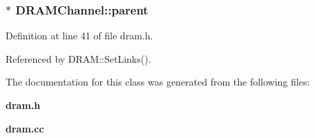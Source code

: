 \subsubsection[{parent}]{$\ast$ {\bf DRAMChannel::parent}}\label{classDRAMChannel_ed6753935c84ed93dd15aea96a530aca}




Definition at line 41 of file dram.h.

Referenced by DRAM::SetLinks().

The documentation for this class was generated from the following files:\begin{CompactItemize}
\item 
{\bf dram.h}\item 
{\bf dram.cc}\end{CompactItemize}

